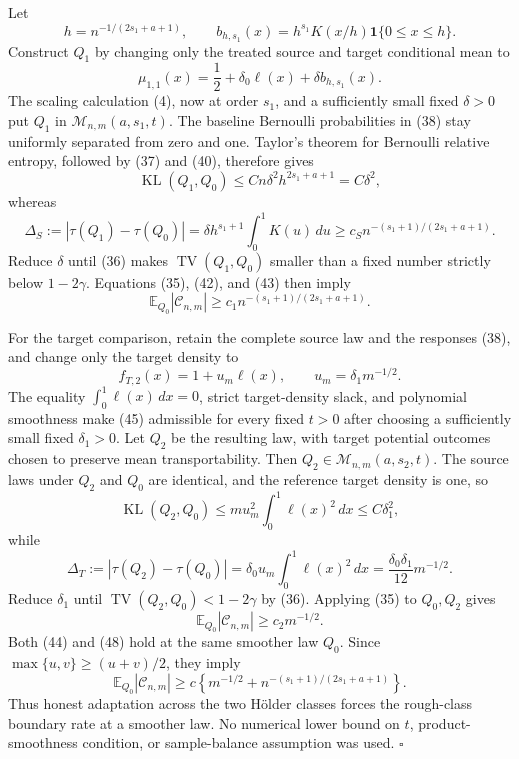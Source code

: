Let
\[
h=n^{-1/(2s_1+a+1)},
\qquad
b_{h,s_1}(x)=h^{s_1}K(x/h)\mathbf 1\{0\le x\le h\}.
\tag{40}
\]
Construct \(Q_1\) by changing only the treated source and target conditional mean to
\[
\mu_{1,1}(x)=\frac12+\delta_0\ell(x)+\delta b_{h,s_1}(x).
\tag{41}
\]
The scaling calculation (4), now at order \(s_1\), and a sufficiently small fixed \(\delta>0\) put \(Q_1\) in \(\mathcal M_{n,m}(a,s_1,t)\). The baseline Bernoulli probabilities in (38) stay uniformly separated from zero and one. Taylor's theorem for Bernoulli relative entropy, followed by (37) and (40), therefore gives
\[
\operatorname{KL}(Q_1,Q_0)
\le Cn\delta^2h^{2s_1+a+1}
=C\delta^2,
\tag{42}
\]
whereas
\[
\Delta_S:=|\tau(Q_1)-\tau(Q_0)|
=\delta h^{s_1+1}\int_0^1K(u)\,du
\ge c_Sn^{-(s_1+1)/(2s_1+a+1)}.
\tag{43}
\]
Reduce \(\delta\) until (36) makes \(\operatorname{TV}(Q_1,Q_0)\) smaller than a fixed number strictly below \(1-2\gamma\). Equations (35), (42), and (43) then imply
\[
\mathbb E_{Q_0}|\mathcal C_{n,m}|
\ge c_1n^{-(s_1+1)/(2s_1+a+1)}.
\tag{44}
\]

For the target comparison, retain the complete source law and the responses (38), and change only the target density to
\[
f_{T,2}(x)=1+u_m\ell(x),
\qquad
u_m=\delta_1m^{-1/2}.
\tag{45}
\]
The equality \(\int_0^1\ell(x)\,dx=0\), strict target-density slack, and polynomial smoothness make (45) admissible for every fixed \(t>0\) after choosing a sufficiently small fixed \(\delta_1>0\). Let \(Q_2\) be the resulting law, with target potential outcomes chosen to preserve mean transportability. Then \(Q_2\in\mathcal M_{n,m}(a,s_2,t)\). The source laws under \(Q_2\) and \(Q_0\) are identical, and the reference target density is one, so
\[
\operatorname{KL}(Q_2,Q_0)
\le m u_m^2\int_0^1\ell(x)^2\,dx
\le C\delta_1^2,
\tag{46}
\]
while
\[
\Delta_T:=|\tau(Q_2)-\tau(Q_0)|
=\delta_0u_m\int_0^1\ell(x)^2\,dx
=\frac{\delta_0\delta_1}{12}m^{-1/2}.
\tag{47}
\]
Reduce \(\delta_1\) until \(\operatorname{TV}(Q_2,Q_0)<1-2\gamma\) by (36). Applying (35) to \(Q_0,Q_2\) gives
\[
\mathbb E_{Q_0}|\mathcal C_{n,m}|
\ge c_2m^{-1/2}.
\tag{48}
\]
Both (44) and (48) hold at the same smoother law \(Q_0\). Since \(\max\{u,v\}\ge(u+v)/2\), they imply
\[
\mathbb E_{Q_0}|\mathcal C_{n,m}|
\ge c\left\{m^{-1/2}+n^{-(s_1+1)/(2s_1+a+1)}\right\}.
\]
Thus honest adaptation across the two H\"older classes forces the rough-class boundary rate at a smoother law. No numerical lower bound on \(t\), product-smoothness condition, or sample-balance assumption was used. \(\square\)